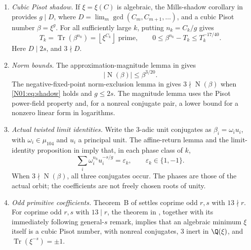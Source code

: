 \documentclass[11pt,a4paper]{article}
\theoremstyle{definition}\newtheorem{definition}[theorem]{Definition}
\theoremstyle{remark}\newtheorem{remark}[theorem]{Remark}
\newcommand{\floor}[1]{\left\lfloor#1\right\rfloor}
\DeclareMathOperator{\Tr}{Tr}\DeclareMathOperator{\tr}{tr}\DeclareMathOperator{\Nm}{N}
\begin{document}
\begin{enumerate}[label=\textup{(I\arabic*)}]
\item\label{N01:input:shadow}
\emph{Cubic Pisot shadow.}
If $\xi=\xi(C)$ is algebraic, the Mills-shadow corollary in
\cite[Section~2]{K064} provides $g\mid D$, where
$D=\lim_m\gcd(C_m,C_{m+1},\ldots)$, and a cubic Pisot number
$\beta=\xi^g$. For all sufficiently large $k$, putting $n_k=C_k/g$ gives
\begin{equation}\label{N01:eq:shadow}
 T_k=\Tr(\beta^{n_k})=\floor{\xi^{C_k}}\text{ prime},\qquad
 0\le\beta^{n_k}-T_k\le T_k^{-17/40}.
\end{equation}
Here $D\mid2s$, and $3\nmid D$.

\item\label{N01:input:norm}
\emph{Norm bounds.}
The approximation-magnitude lemma in \cite[Section~3.7]{K064} gives
\begin{equation}\label{N01:eq:norm}
 |\Nm(\beta)|\le\beta^{3/20}.
\end{equation}
The negative-fixed-point norm-exclusion lemma in
\cite[Section~4, lemma titled $3\nmid\Nm(\beta)$ at negative fixed
points]{K064} gives $3\nmid\Nm(\beta)$ when \eqref{N01:eq:shadow} holds
and $g\le2s$. The magnitude lemma uses the Pisot power-field property
and, for a nonreal conjugate pair, a lower bound for a nonzero linear
form in logarithms.

\item\label{N01:input:limits}
\emph{Actual twisted limit identities.}
Write the $3$-adic unit conjugates as $\beta_i=\omega_i u_i$, with
$\omega_i\in\mu_{104}$ and $u_i$ a principal unit. The affine-return
lemma and the limit-identity proposition in
\cite[Sections~3.4--3.5]{K064} imply that, in each phase class of $k$,
\begin{equation}\label{N01:eq:general-limit}
 \sum_i\omega_i^{n_k}u_i^{-s/g}=\varepsilon_k,
 \qquad\varepsilon_k\in\{1,-1\}.
\end{equation}
When $3\nmid\Nm(\beta)$, all three conjugates occur. The phases are
those of the actual orbit; the coefficients are not freely chosen
roots of unity.

\item\label{N01:input:odd}
\emph{Odd primitive coefficients.}
Theorem~B of \cite{K064} settles coprime odd $r,s$ with $13\nmid r$.
For coprime odd $r,s$ with $13\mid r$, the theorem in
\cite[Section~7.2]{K064}, together with its immediately following
general-$s$ remark, implies that an algebraic minimum $\xi$ itself is
a cubic Pisot number, with nonreal conjugates, $3$ inert in $\Q(\xi)$,
and $\Tr(\xi^{-s})=\pm1$.
\end{enumerate}
\end{document}
